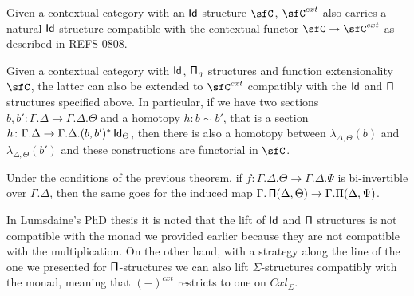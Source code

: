 \begin{prop}\cite[Prop.\ 3.3.1]{Gar09b}
  Given a contextual category with an $\operatorname{\mathsf{Id}}$-structure $\sfC$, $\sfC^{cxt}$ also
  carries a natural $\operatorname{\mathsf{Id}}$-structure compatible with the contextual functor
  $\sfC\rightarrow\sfC^{cxt}$ as described in REFS 0808.
\end{prop}

\begin{lem}\cite[Lemma 2.28]{1808}
  Given a contextual category with $\operatorname{\mathsf{Id}}$, $\operatorname{\mathsf{\Pi}_\eta}$ structures and function
  extensionality $\sfC$, the latter can also be extended to $\sfC^{cxt}$
  compatibly with the $\operatorname{\mathsf{Id}}$ and $\operatorname{\mathsf{\Pi}}$ structures specified above. In particular,
  if we have two sections
  $b,b'\colon\Gamma.\Delta\rightarrow\Gamma.\Delta.\Theta$ and a homotopy
  $h:b\sim b'$, that is a section
  $h\colon\Gamma.\Delta\rightarrow\Gamma.\Delta.(b,b')^*\operatorname{\mathsf{Id}}_{\Theta}$,
  then there is also a homotopy between $\lambda_{\Delta,\Theta}(b)$ and
  $\lambda_{\Delta,\Theta}(b')$ and these constructions are functorial in $\sfC$.
\end{lem}

\begin{cor}\cite[Lemma 2.29]{1808}
  Under the conditions of the previous theorem, if
  $f\colon\Gamma.\Delta.\Theta\rightarrow\Gamma.\Delta.\Psi$ is
  bi-invertible over $\Gamma.\Delta$, then the same goes for the induced map
  $\Gamma.\operatorname{\mathsf{\Pi}}(\Delta,\Theta)\rightarrow\Gamma.\Pi(\Delta,\Psi)$.
\end{cor}



\begin{rmk}
  In Lumsdaine's PhD thesis it is noted that the lift of $\operatorname{\mathsf{Id}}$ and $\operatorname{\mathsf{\Pi}}$
  structures is not compatible with the monad we provided earlier because they
  are not compatible with the multiplication. On the other
  hand, with a strategy along the line of the one we presented for
  $\operatorname{\mathsf{\Pi}}$-structures we can also lift $\Sigma$-structures compatibly with the
  monad, meaning that $(-)^{cxt}$ restricts to one on $Cxl_\Sigma$.
\end{rmk}
